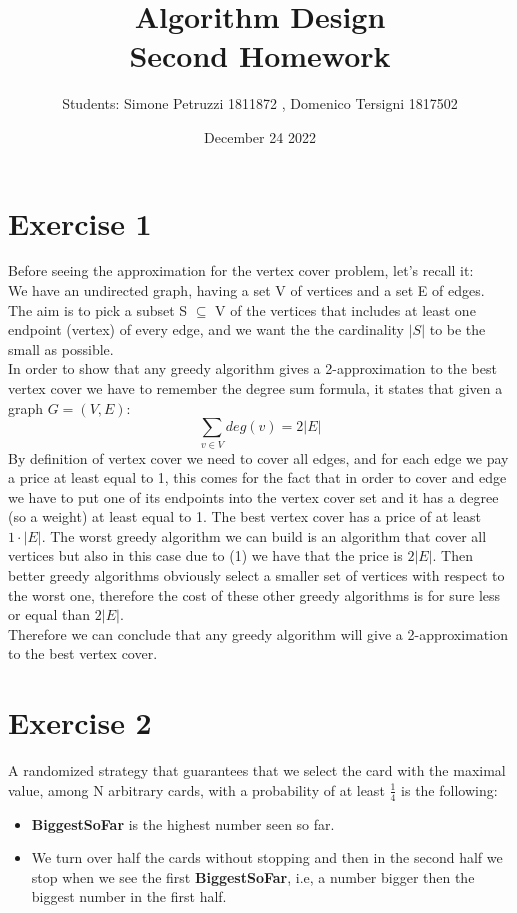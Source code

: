 \documentclass[11pt]{article}
\title{\textbf{Algorithm Design}\\
	   Second Homework}
\author{Students: Simone Petruzzi 1811872 , Domenico Tersigni 1817502}
\date{December 24 2022}
\theoremstyle{definition}
\begin{document}
\maketitle
\newpage

\section{Exercise 1}
Before seeing the approximation for the vertex cover problem, let's recall it:\\
We have an undirected graph, having a set V of vertices and a set E of edges. The aim is to pick a subset S $\subseteq$ V of the vertices that includes at least one endpoint (vertex) of every edge, and we want the the cardinality $|S|$ to be the small as possible.\\

In order to show that any greedy algorithm gives a 2-approximation to the best vertex cover we have to remember the degree sum formula, it states that given a graph $ G = (V,E)$:
\begin{equation}
\sum_{v \in V} deg(v) = 2  \left| E \right|
\end{equation}
By definition of vertex cover we need to cover all edges, and for each edge we pay a price at least equal to 1, this comes for the fact that in order to cover and edge we have to put one of its endpoints into the vertex cover set and it has a degree (so a weight) at least equal to 1. The best vertex cover has a price of at least $1 \cdot \left| E \right|$. The worst greedy algorithm we can build is an algorithm that cover all vertices but also in this case due to (1) we have that the price is  $2  \left| E \right|$. Then better greedy algorithms obviously select a smaller set of vertices with respect to the worst one, therefore the cost of these other greedy algorithms is for sure less or equal than $2  \left| E \right|$.\\  
Therefore we can conclude that any greedy algorithm will give a 2-approximation to the best vertex cover.
\newpage

\section{Exercise 2}
A randomized strategy that guarantees that we select the card with the maximal value, among N arbitrary cards, with a probability of at least $\frac{1}{4}$  is the following:
\begin{itemize}
\item \textbf{BiggestSoFar} is the highest number seen so far.
\item We turn over half the cards without stopping and then in the second half we stop when we see the first \textbf{BiggestSoFar}, i.e, a number bigger then the biggest number in the first half.
\end{itemize}
\end{document}
